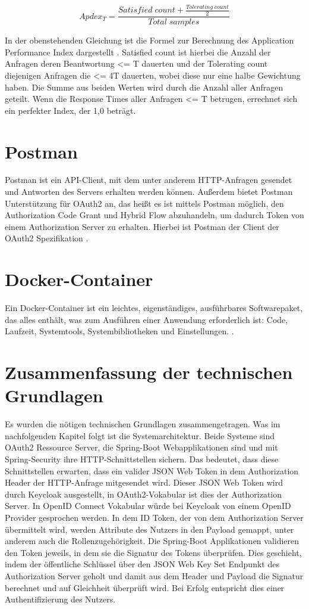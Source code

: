 \begin{equation}
  Apdex_T = \frac{Satisfied\;count + \frac{Tolerating\;count}{2}}{Total\;samples}
\end{equation}

In der obenstehenden Gleichung ist die Formel zur Berechnung des Application Performance Index dargestellt \citep{apdex:2007}. Satisfied count ist hierbei die Anzahl der Anfragen deren Beantwortung <= T dauerten und der Tolerating 
count diejenigen Anfragen die <= 4T dauerten, wobei diese nur eine halbe Gewichtung 
haben. Die Summe aus beiden Werten wird durch die Anzahl aller Anfragen geteilt. Wenn die Response Times aller Anfragen <= T betrugen, errechnet sich ein perfekter Index, 
der 1,0 beträgt.

\section{Postman}
Postman ist ein API-Client, mit dem unter anderem HTTP-Anfragen gesendet und Antworten 
des Servers erhalten werden können. Außerdem bietet Postman Unterstützung für 
OAuth2 an, das heißt es ist mittels Postman möglich, den Authorization Code Grant und
Hybrid Flow abzuhandeln, um dadurch Token von einem Authorization Server zu erhalten. Hierbei ist Postman der Client der OAuth2 Spezifikation \citep{postman:2021}.

\section{Docker-Container}
Ein Docker-Container ist ein leichtes, eigenständiges, ausführbares Softwarepaket, das alles enthält, was zum Ausführen einer Anwendung erforderlich ist: Code, Laufzeit, Systemtools, Systembibliotheken und Einstellungen. \citep{docker:2021}. 

\section{Zusammenfassung der technischen Grundlagen}
Es wurden die nötigen technischen Grundlagen zusammengetragen. Was im nachfolgenden Kapitel folgt ist die Systemarchitektur.
Beide Systeme sind OAuth2 Ressource Server, die Spring-Boot Webapplikationen sind und mit Spring-Security ihre HTTP-Schnittstellen sichern. Das bedeutet, dass diese Schnittstellen erwarten, dass ein valider JSON Web Token in dem Authorization Header der HTTP-Anfrage mitgesendet wird. Dieser JSON Web Token wird durch Keycloak ausgestellt, in OAuth2-Vokabular ist dies der Authorization Server. In OpenID Connect Vokabular würde bei Keycloak von einem OpenID Provider gesprochen werden. In dem ID Token, der von dem 
Authorization Server übermittelt wird, werden Attribute des Nutzers in den Payload 
gemappt, unter anderem auch die Rollenzugehörigkeit. Die Spring-Boot Applikationen 
validieren den Token jeweils, in dem sie die Signatur des Tokens überprüfen. Dies 
geschieht, indem der öffentliche Schlüssel über den JSON Web Key Set Endpunkt des Authorization 
Server geholt und damit aus dem Header und Payload die Signatur berechnet und auf 
Gleichheit überprüft wird. Bei Erfolg 
entspricht dies einer Authentifizierung des Nutzers.\smallskip

